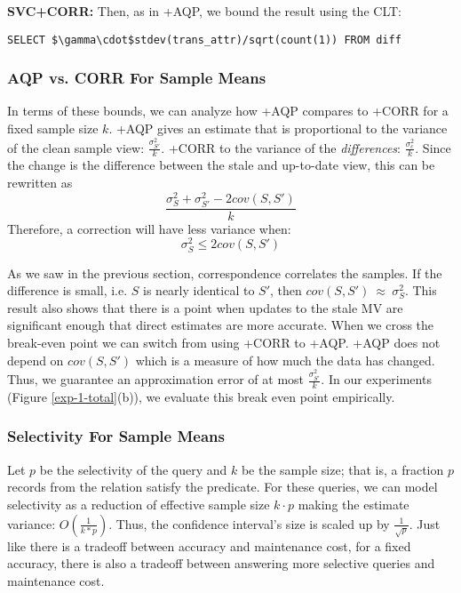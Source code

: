 \vspace{0.35em}\noindent\textbf{SVC+CORR: } Then, as in \svcnospace+AQP, we bound the result using the CLT:
\begin{lstlisting}[mathescape,basicstyle={\scriptsize}]
SELECT $\gamma\cdot$stdev(trans_attr)/sqrt(count(1)) FROM diff
\end{lstlisting}

\subsubsection{AQP vs. CORR For Sample Means}
In terms of these bounds, we can analyze how \svcnospace+AQP compares to \svcnospace+CORR for a fixed sample size $k$.
\sloppy
\svcnospace+AQP gives an estimate that is proportional to the variance of the clean sample view: 
$\frac{\sigma_{S'}^2}{k}$.
\svcnospace+CORR to the variance of the \emph{differences}: 
$\frac{\sigma_{c}^2}{k}$.
Since the change is the difference between the stale and up-to-date view, this can be rewritten as
\[\frac{\sigma_{S}^2 + \sigma_{S'}^2 - 2cov(S,S')}{k}\]
Therefore, a correction will have less variance when:
\[\sigma_{S}^2 \le 2cov(S,S')\]

As we saw in the previous section, correspondence correlates the samples.
If the difference is small, i.e. $S$ is nearly identical to $S'$, then $cov(S,S')~\approx~\sigma_{S}^2$. 
This result also shows that there is a point when updates to the stale MV are significant enough that direct estimates are more accurate.
When we cross the break-even point we can switch from using \svcnospace+CORR to \svcnospace+AQP.
\svcnospace+AQP does not depend on $cov(S,S')$ which is a measure of how much the data has changed.
Thus, we guarantee an approximation error of at most $\frac{\sigma_{S'}^2}{k}$.
In our experiments (Figure \ref{exp-1-total}(b)), we evaluate this break even point empirically. 

\subsubsection{Selectivity For Sample Means}
Let $p$ be the selectivity of the query and $k$ be the sample size; that is, a fraction $p$ records from the relation satisfy the predicate.
For these queries, we can model selectivity as a reduction of effective sample size $k\cdot p$ making the
estimate variance: $O(\frac{1}{k*p})$.
Thus, the confidence interval's size is scaled up by $\frac{1}{\sqrt{p}}$.
Just like there is a tradeoff between accuracy and maintenance cost, for a fixed accuracy, 
there is also a tradeoff between answering more selective queries and maintenance cost.

